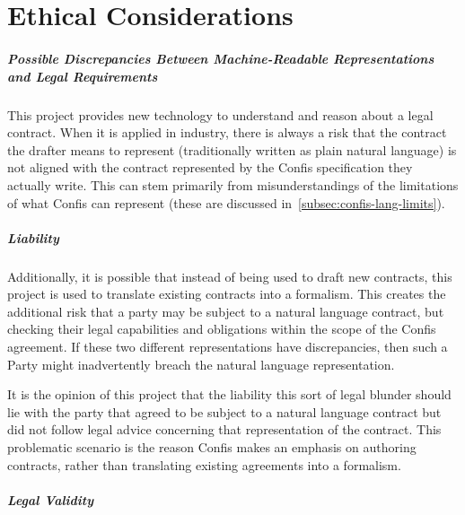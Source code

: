 
\chapter{Ethical Considerations}\label{ch:ethical}


\paragraph{Possible Discrepancies Between Machine-Readable Representations and Legal Requirements}
\label{par:legal-discrepancies}

This project provides new technology to understand and reason about a legal contract.
When it is applied in industry, there is always a risk that the contract the drafter means to represent (traditionally written as plain natural language) is not aligned with the contract represented by the Confis specification they actually write.
This can stem primarily from misunderstandings of the limitations of what Confis can represent (these are discussed in~\autoref{subsec:confis-lang-limits}).

\paragraph{Liability}\label{par:liability}

Additionally, it is possible that instead of being used to draft new contracts, this project is used to translate existing contracts into a formalism.
This creates the additional risk that a party may be subject to a natural language contract, but checking their legal capabilities and obligations within the scope of the Confis agreement.
If these two different representations have discrepancies, then such a Party might inadvertently breach the natural language representation.

It is the opinion of this project that the liability this sort of legal blunder should lie with the party that agreed to be subject to a natural language contract but did not follow legal advice concerning that representation of the contract.
This problematic scenario is the reason Confis makes an emphasis on authoring contracts, rather than translating existing agreements into a formalism.

\paragraph{Legal Validity}\label{par:legal-validity}


